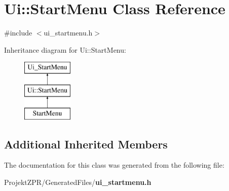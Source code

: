 \section{Ui\-:\-:Start\-Menu Class Reference}
\label{class_ui_1_1_start_menu}


{\ttfamily \#include $<$ui\-\_\-startmenu.\-h$>$}

Inheritance diagram for Ui\-:\-:Start\-Menu\-:\begin{figure}[H]
\begin{center}
\leavevmode
\includegraphics[height=3.000000cm]{class_ui_1_1_start_menu}
\end{center}
\end{figure}
\subsection*{Additional Inherited Members}


The documentation for this class was generated from the following file\-:\begin{DoxyCompactItemize}
\item 
Projekt\-Z\-P\-R/\-Generated\-Files/{\bf ui\-\_\-startmenu.\-h}\end{DoxyCompactItemize}
